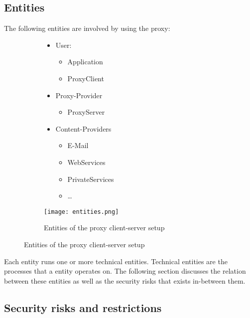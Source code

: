 \documentclass[12pt, a4paper]{scrartcl}
\begin{document}
\subsection{Entities}
The following entities are involved by using the proxy:
\begin{figure}[H]
    \centering
    \begin{subfigure}{0.45\textwidth}
        \begin{itemize}
            \item User:
            \begin{itemize}
                \item Application
                \item ProxyClient
            \end{itemize}
            \item Proxy-Provider
            \begin{itemize}
                \item ProxyServer
            \end{itemize}
            \item Content-Providers
            \begin{itemize}
                \item E-Mail
                \item WebServices
                \item PrivateServices
                \item \ldots
            \end{itemize}
        \end{itemize}
    \end{subfigure}
    \begin{subfigure}{0.5\textwidth}
        \centering
        \texttt{[image: entities.png]}
        \caption{Entities of the proxy client-server setup}
        \label{fig::enti}
    \end{subfigure}
\end{figure}

\noindent Each entity runs one or more technical entities. Technical entities are the processes that a entity operates on.\newline
The following section discusses the relation between these entities as well as the security risks that exists in-between them.

\subsection{Security risks and restrictions}
\end{document}
